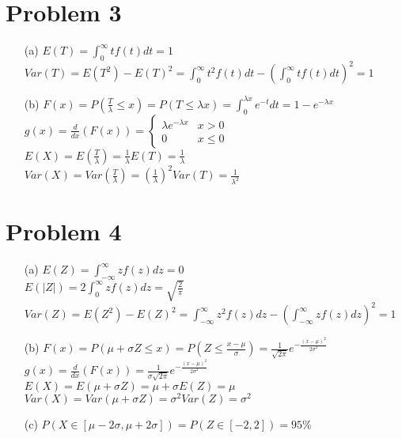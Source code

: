 \documentclass{article}
\begin{document}
\section*{Problem 3}
\begin{itemize}
	\item [(a)] $E(T)=\int_0^\infty tf(t)dt=\boxed{1}$\\$Var(T)=E(T^2)-E(T)^2=\int_0^\infty t^2f(t)dt-(\int_0^\infty tf(t)dt)^2=\boxed{1}$
	\item [(b)] $F(x)=P(\frac{T}{\lambda}\leq x)=P(T\leq\lambda x)=\int_0^{\lambda x}e^{-t}dt=1-e^{-\lambda x}$\\$g(x)=\frac{d}{dx}(F(x))=\begin{cases}\lambda e^{-\lambda x}&x>0\\0&x\leq 0\end{cases}$\\$E(X)=E(\frac{T}{\lambda})=\frac{1}{\lambda}E(T)=\boxed{\frac{1}{\lambda}}$\\$Var(X)=Var(\frac{T}{\lambda})=(\frac{1}{\lambda})^2Var(T)=\boxed{\frac{1}{\lambda^2}}$
\end{itemize}

\section*{Problem 4}
\begin{itemize}
	\item [(a)] $E(Z)=\int_{-\infty}^\infty zf(z)dz=\boxed{0}$\\$E(|Z|)=2\int_0^\infty zf(z)dz=\boxed{\sqrt{\frac{2}{\pi}}}$\\$Var(Z)=E(Z^2)-E(Z)^2=\int_{-\infty}^\infty z^2f(z)dz-(\int_{-\infty}^\infty zf(z)dz)^2=\boxed{1}$
	\item [(b)] $F(x)=P(\mu+\sigma Z\leq x)=P(Z\leq \frac{x-\mu}{\sigma})=\frac{1}{\sqrt{2\pi}}e^{-\frac{(x-\mu)^2}{2\sigma^2}}$\\$g(x)=\frac{d}{dx}(F(x))=\boxed{\frac{1}{\sigma\sqrt{2\pi}}e^{-\frac{(x-\mu)^2}{2\sigma^2}}}$\\$E(X)=E(\mu+\sigma Z)=\mu+\sigma E(Z)=\boxed{\mu}$\\$Var(X)=Var(\mu+\sigma Z)=\sigma^2Var(Z)=\boxed{\sigma^2}$
	\item [(c)] $P(X\in[\mu-2\sigma,\mu+2\sigma])=P(Z\in[-2,2])=\boxed{95\%}$
\end{itemize}
\end{document}
